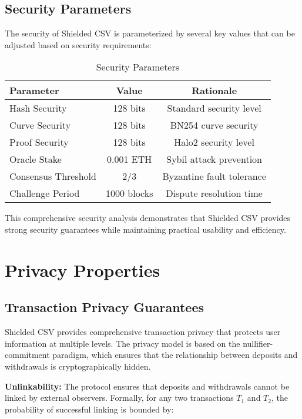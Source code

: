 \documentclass[11pt,a4paper]{article}
\begin{document}
\subsection{Security Parameters}

The security of Shielded CSV is parameterized by several key values that can be adjusted based on security requirements:

\begin{table}[h]
\centering
\caption{Security Parameters}
\begin{tabular}{|l|c|c|}
\hline
\textbf{Parameter} & \textbf{Value} & \textbf{Rationale} \\
\hline
Hash Security & 128 bits & Standard security level \\
Curve Security & 128 bits & BN254 curve security \\
Proof Security & 128 bits & Halo2 security level \\
Oracle Stake & 0.001 ETH & Sybil attack prevention \\
Consensus Threshold & 2/3 & Byzantine fault tolerance \\
Challenge Period & 1000 blocks & Dispute resolution time \\
\hline
\end{tabular}
\end{table}

This comprehensive security analysis demonstrates that Shielded CSV provides strong security guarantees while maintaining practical usability and efficiency.

\section{Privacy Properties}

\subsection{Transaction Privacy Guarantees}

Shielded CSV provides comprehensive transaction privacy that protects user information at multiple levels. The privacy model is based on the nullifier-commitment paradigm, which ensures that the relationship between deposits and withdrawals is cryptographically hidden.

\textbf{Unlinkability:}
The protocol ensures that deposits and withdrawals cannot be linked by external observers. Formally, for any two transactions $T_1$ and $T_2$, the probability of successful linking is bounded by:
\end{document}
